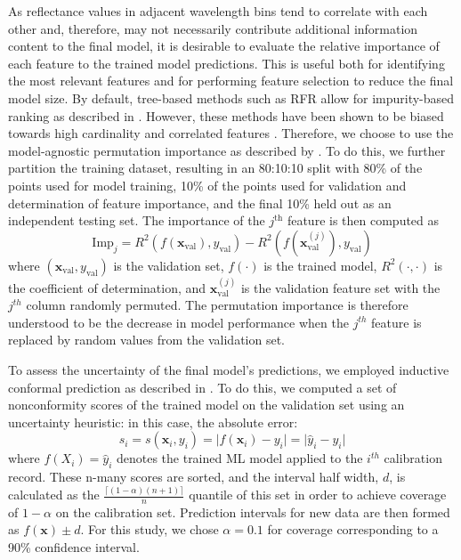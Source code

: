 As reflectance values in adjacent wavelength bins tend to correlate with each
other and, therefore, may not necessarily contribute additional information
content to the final model, it is desirable to evaluate the relative importance
of each feature to the trained model predictions. This is useful both for
identifying the most relevant features and for performing feature selection to
reduce the final model size. By default, tree-based methods such as RFR allow
for impurity-based ranking as described in \cite{random-forest,
  rfr-importance-ranking}. However, these methods have been shown to be biased
towards high cardinality and correlated features \cite{strobl2008conditional}.
Therefore, we choose to use the model-agnostic permutation importance as
described by \cite{parr2018beware}. To do this, we further partition the
training dataset, resulting in an 80:10:10 split with 80\% of the points used
for model training, 10\% of the points used for validation and determination of
feature importance, and the final 10\% held out as an independent testing set.
The importance of the $j^{\text{th}}$ feature is then computed as
\begin{equation}
    \text{Imp}_j = R^2(f(\mathbf{x}_{\text{val}}), y_{\text{val}}) - R^2(f(\mathbf{x}_{\text{val}}^{(j)}), y_{\text{val}})
\end{equation}
where $(\mathbf{x}_{\text{val}}, y_{\text{val}})$ is the validation set, $f(\cdot)$ is
the trained model, $R^2(\cdot, \cdot)$ is the coefficient of determination, and
$\mathbf{x}_{\text{val}}^{(j)}$ is the validation feature set with the $j^{th}$ column
randomly permuted. The permutation importance is therefore understood to be the
decrease in model performance when the $j^{th}$ feature is replaced by random
values from the validation set.

To assess the uncertainty of the final model's predictions, we employed
inductive conformal prediction as described in \cite{conformal-prediction-1,
  conformal-prediction-2, conformal-prediction-3, conformal-prediction-4}. To do
this, we computed a set of nonconformity scores of the trained model on the
validation set using an uncertainty heuristic: in this case, the absolute error:
\begin{equation}
    s_i = s(\mathbf{x}_i, y_i) = \lvert f(\mathbf{x}_i) - y_i \rvert = \lvert \hat{y}_i - y_i \rvert
\end{equation}
where $f(X_i)=\hat{y}_i$ denotes the trained ML model applied to the $i^{th}$
calibration record. These n-many scores are sorted, and the interval half width,
$d$, is calculated as the $\frac{\lceil(1-\alpha)(n+1) \rceil}{n}$ quantile of
this set in order to achieve coverage of $1-\alpha$ on the calibration set.
Prediction intervals for new data are then formed as $f(\mathbf{x})\pm d$. For this
study, we chose $\alpha=0.1$ for coverage corresponding to a 90\% confidence
interval.

